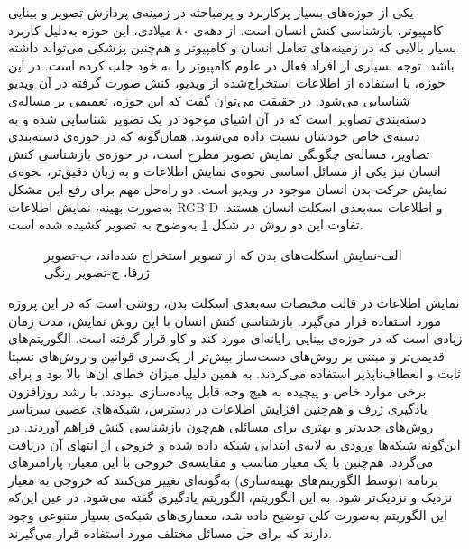 



یکی از حوزه‌های بسیار پرکاربرد و پرمباحثه در زمینه‌ی پردازش تصویر و بینایی کامپیوتر، بازشناسی کنش انسان است. از دهه‌ی ۸۰ میلادی، این حوزه به‌دلیل کاربرد بسیار بالایی که در زمینه‌‌های تعامل انسان و کامپیوتر و هم‌چنین پزشکی می‌تواند داشته باشد، توجه بسیاری از افراد فعال در علوم کامپیوتر را به خود جلب کرده است.\cite{Wikipedia} در این حوزه، با استفاده از اطلاعات استخراج‌شده از ویدیو، کنش صورت گرفته در آن ویدیو شناسایی می‌شود. در حقیقت می‌توان گفت که این حوزه، تعمیمی بر مساله‌ی دسته‌بندی تصاویر است که در آن اشیای موجود در یک تصویر شناسایی شده و به دسته‌ی خاص خودشان نسبت داده می‌شوند. همان‌گونه که در حوزه‌ی دسته‌بندی تصاویر، مساله‌ی چگونگی نمایش تصویر مطرح است، در حوزه‌ی بازشناسی کنش انسان نیز یکی از مسائل اساسی نحوه‌ی نمایش اطلاعات و به زبان دقیق‌تر، نحوه‌ی نمایش حرکت بدن انسان موجود در ویدیو است. دو راه‌حل مهم برای رفع این مشکل به‌صورت بهینه، نمایش اطلاعات RGB-D  و اطلاعات سه‌بعدی اسکلت انسان هستند.\cite{review}\cite{survey} تفاوت این دو روش در شکل \ref{fig:examp1} به‌وضوح به تصویر کشیده شده است.


\begin{figure}
\caption[ الف-نمایش اسکلت‌های بدن که از تصویر استخراج شده‌اند، ب-تصویر ژرفا، ج-تصویر رنگی]{{\footnotesize  الف-نمایش اسکلت‌های بدن که از تصویر استخراج شده‌اند، ب-تصویر ژرفا، ج-تصویر رنگی  \cite{rgbdVsSkeleton}} }
\label{fig:examp1}
\end{figure}

نمایش اطلاعات در قالب مختصات سه‌بعدی اسکلت بدن، روشی است که در این پروژه مورد استفاده قرار می‌گیرد. بازشناسی کنش انسان با این روش نمایش، مدت زمان زیادی است که در حوزه‌ی بینایی رایانه‌ای مورد کند و کاو قرار گرفته است. الگوریتم‌های قدیمی‌تر و مبتنی بر روش‌های دست‌ساز بیش‌تر از یک‌سری قوانین و روش‌های نسبتا ثابت و انعطاف‌ناپذیر استفاده می‌کردند. به همین دلیل میزان خطای آن‌ها بالا بود و برای برخی موارد خاص و پیچیده به هیچ وجه قابل پیاده‌سازی نبودند.\cite{st-gcn} با رشد روزافزون یادگیری ژرف و هم‌چنین افزایش اطلاعات در دسترس، شبکه‌های عصبی سرتاسر روش‌های جدیدتر و بهتری برای مسائلی هم‌چون بازشناسی کنش فراهم آوردند. در این‌گونه شبکه‌ها ورودی به لایه‌ی ابتدایی شبکه داده شده و خروجی از انتهای آن دریافت می‌گردد. هم‌چنین با یک معیار مناسب و مقایسه‌ی خروجی با این معیار، پارامترهای برنامه (توسط الگوریتم‌های بهینه‌سازی) به‌گونه‌ای تغییر می‌کنند که خروجی به معیار نزدیک و نزدیک‌تر شود. به این الگوریتم، الگوریتم یادگیری گفته می‌شود. در عین این‌که این الگوریتم به‌صورت کلی توضیح داده شد، معماری‌های شبکه‌ی بسیار متنوعی وجود دارند که برای حل مسائل مختلف مورد استفاده قرار می‌گیرند. 

